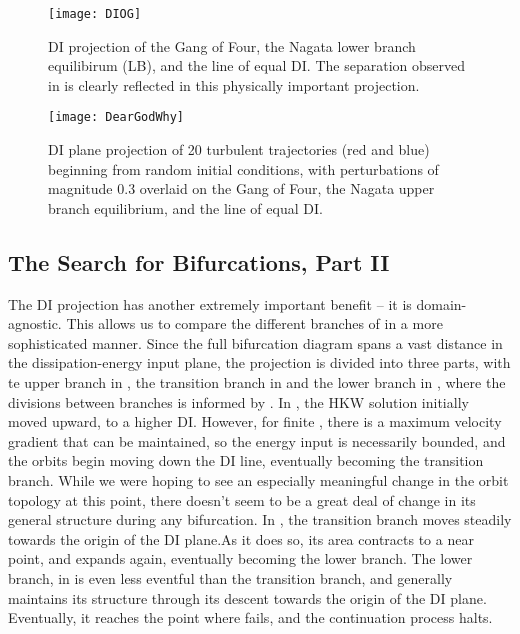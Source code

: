 \begin{figure}[h]
\texttt{[image: DIOG]}
\caption{DI projection of the Gang of Four, the Nagata lower branch equilibirum (LB), and the line of equal DI. The separation observed in  is clearly reflected in this physically important projection.}\label{fig:DIGOF}
\end{figure}

\begin{figure}[h]
\texttt{[image: DearGodWhy]}
\caption{DI plane projection of 20 turbulent trajectories (red and blue) beginning from random initial conditions, with perturbations of magnitude $0.3$ overlaid on the Gang of Four, the Nagata upper branch equilibrium, and the line of equal DI.}\label{fig:turbDI}
\end{figure}

\subsection{The Search for Bifurcations, Part II}
The DI projection has another extremely important benefit -- it is domain-agnostic. This allows us to compare the different branches of  in a more sophisticated manner. Since the full bifurcation diagram spans a vast distance in the dissipation-energy input plane, the projection is divided into three parts, with te upper branch in , the transition branch in  and the lower branch in , where the divisions between branches is informed by . In , the HKW solution initially moved upward, to a higher DI. However, for finite \ReN, there is a maximum velocity gradient that can be maintained, so the energy input is necessarily bounded, and the orbits begin moving down the DI line, eventually becoming the transition branch. While we were hoping to see an especially meaningful change in the orbit topology at this point, there doesn't seem to be a great deal of change in its general structure during any bifurcation. In , the transition branch moves steadily towards the origin of the DI plane.As it does so, its area contracts to a near point, and expands again, eventually becoming the lower branch. The lower branch, in  is even less eventful than the transition branch, and generally maintains its structure through its descent towards the origin of the DI plane. Eventually, it reaches the point where  fails, and the continuation process halts.\\
 

